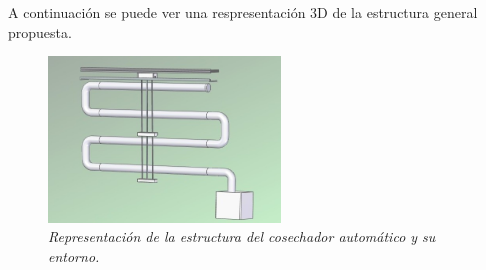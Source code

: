 A continuación se puede ver una respresentación 3D de la estructura general propuesta.
\begin{figure}[H]
        \centering
        \includegraphics[width=0.55\textwidth]{img/ClaudioReal_simplificado.jpg}
        \caption{\textit{Representación de la estructura del cosechador automático y su entorno.}}
        \label{fig:ClaudioReal_simplificado}
\end{figure}
